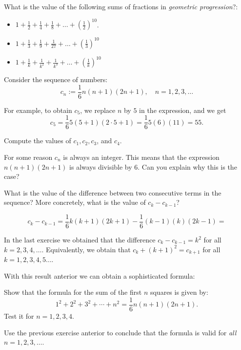 \begin{exercise}
What is the value of the following sums of fractions in \emph{geometric progression}?:
\begin{itemize} 
    \item $1+\frac{1}{2}+\frac{1}{4}+\frac{1}{8}+\dots +\left(\frac{1}{2}\right)^{10}$.
    \item $1+\frac{1}{3}+\frac{1}{9}+\frac{1}{27}+\dots+\left(\frac{1}{3}\right)^{10}$
    \item $1+\frac{1}{k}+\frac{1}{k^2}+\frac{1}{k^3}+\dots+\left(\frac{1}{k}\right)^{10}$
    \end{itemize}
\end{exercise}
\tutpagebreak

Consider the sequence of numbers: $$c_n:=\frac{1}{6}n(n+1)(2n+1), \quad n=1,2,3,\dots $$

For example, to obtain $c_5$, we replace $n$ by $5$ in the expression, and we get $$c_5 = \frac{1}{6}5(5+1)(2\cdot5+1) = \frac{1}{6}5(6)(11) = 55.$$ 

\begin{exercise} 
Compute the values of $c_1,c_2,c_3$, and $c_4$.
\end{exercise}

\begin{exercise} 
For some reason $c_n$ is always an integer. This means that the expression $n(n+1)(2n+1)$ is always divisible by $6$. Can you explain why this is the case?
\end{exercise}

\begin{exercise} 
What is the value of the difference between two consecutive terms in the sequence? More concretely, what is the value of $c_k-c_{k-1}$?
\end{exercise}
$$c_k-c_{k-1} = \frac{1}{6}k(k+1)(2k+1)-\frac{1}{6}(k-1)(k)(2k-1) = $$
\tutpagebreak

In the last exercise we obtained that the difference $c_k-c_{k-1} = k^2$ for all $k=2,3,4,\dots$. Equivalently, we obtain that $c_{k}+(k+1)^2=c_{k+1}$ for all $k=1,2,3,4,5\dots$. 

With this result anterior we can obtain a sophisticated formula:

\begin{exercise}
Show that the formula for the sum of the first $n$ squares is given by: $$1^2+2^2+3^2+\cdots+n^2=\frac{1}{6}n(n+1)(2n+1).$$ 
Test it for $n=1,2,3,4$.

Use the previous exercise anterior to conclude that the formula is valid for \emph{all} $n=1,2,3, \dots$.
\end{exercise}
\tutpagebreak

